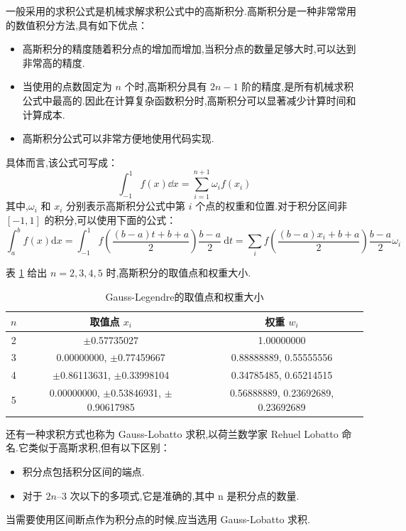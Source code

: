 \documentclass{book}
\begin{document}
一般采用的求积公式是机械求解求积公式中的高斯积分.高斯积分是一种非常常用的数值积分方法,具有如下优点：
\begin{itemize}
    \item 高斯积分的精度随着积分点的增加而增加,当积分点的数量足够大时,可以达到非常高的精度.
    \item 当使用的点数固定为 $n$ 个时,高斯积分具有 $2n-1$ 阶的精度,是所有机械求积公式中最高的.因此在计算复杂函数积分时,高斯积分可以显著减少计算时间和计算成本.
    \item 高斯积分公式可以非常方便地使用代码实现.
\end{itemize}
具体而言,该公式可写成：
\begin{equation}
    \int_{-1}^1 f(x)\dd x=\sum_{i=1}^{n+1}\omega_if(x_i)
\end{equation}
其中,$\omega_i$ 和 $x_i$ 分别表示高斯积分公式中第 $i$ 个点的权重和位置.对于积分区间非 $[-1,1]$ 的积分,可以使用下面的公式：
\begin{equation}
    \int_{a}^{b} f(x) \mathrm{d} x=\int_{-1}^{1} f\left(\frac{(b-a) t+b+a}{2}\right) \frac{b-a}{2} \mathrm{~d} t=\sum_i f(\frac{(b-a)x_i+b+a}{2})\frac{b-a}{2}\omega_i
\end{equation}

表 \ref{tab:Gauss-Legendre积分} 给出 $n=2,3,4,5$ 时,高斯积分的取值点和权重大小.
\begin{table}[ht]
    \centering
    \caption{Gauss-Legendre的取值点和权重大小}
    \label{tab:Gauss-Legendre积分}
    \begin{tabular}{ccc}
        \toprule
        $n$ & 取值点 $x_i$                                 & 权重 $w_i$                         \\
        \midrule
        2   & $\pm$0.57735027                              & 1.00000000                         \\
        3   & 0.00000000, $\pm$0.77459667                  & 0.88888889, 0.55555556             \\
        4   & $\pm$0.86113631, $\pm$0.33998104             & 0.34785485, 0.65214515             \\
        5   & 0.00000000, $\pm$0.53846931, $\pm$0.90617985 & 0.56888889, 0.23692689, 0.23692689 \\
        \bottomrule
    \end{tabular}
\end{table}


还有一种求积方式也称为 Gauss-Lobatto 求积,以荷兰数学家 Rehuel Lobatto 命名.它类似于高斯求积,但有以下区别：
\begin{itemize}
    \item 积分点包括积分区间的端点.
    \item 对于 $2n – 3$ 次以下的多项式,它是准确的,其中 n 是积分点的数量.
\end{itemize}
当需要使用区间断点作为积分点的时候,应当选用 Gauss-Lobatto 求积.
\end{document}
